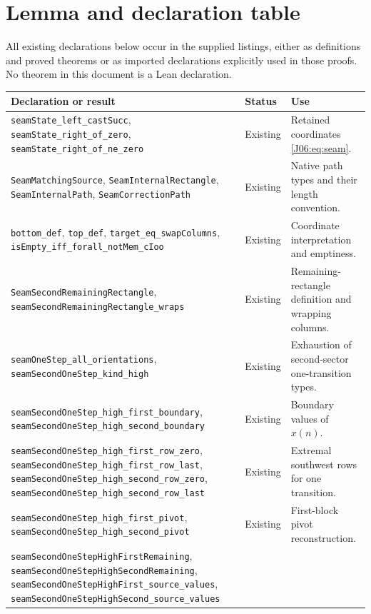 \documentclass[11pt,oneside]{report}
\theoremstyle{definition}
\numberwithin{equation}{section}
\newcommand{\decl}[1]{\textnormal{\nolinkurl{#1}}}
\begin{document}
\section{Lemma and declaration table}

All existing declarations below occur in the supplied listings, either
as definitions and proved theorems or as imported declarations explicitly
used in those proofs. No theorem in this document is a Lean declaration.

\small
\begin{longtable}{@{}>{\raggedright\arraybackslash}p{}>{\raggedright\arraybackslash}p{}>{\raggedright\arraybackslash}p{}@{}}
\toprule
Declaration or result & Status & Use\\
\midrule
\endhead
\decl{seamState_left_castSucc},
\decl{seamState_right_of_zero},
\decl{seamState_right_of_ne_zero}
& Existing & Retained coordinates \eqref{J06:eq:seam}.\\
\decl{SeamMatchingSource},
\decl{SeamInternalRectangle},
\decl{SeamInternalPath},
\decl{SeamCorrectionPath}
& Existing & Native path types and their length convention.\\
\decl{bottom_def}, \decl{top_def},
\decl{target_eq_swapColumns},
\decl{isEmpty_iff_forall_notMem_cIoo}
& Existing & Coordinate interpretation and emptiness.\\
\decl{SeamSecondRemainingRectangle},
\decl{seamSecondRemainingRectangle_wraps}
& Existing & Remaining-rectangle definition and wrapping columns.\\
\decl{seamOneStep_all_orientations},
\decl{seamSecondOneStep_kind_high}
& Existing & Exhaustion of second-sector one-transition types.\\
\decl{seamSecondOneStep_high_first_boundary},
\decl{seamSecondOneStep_high_second_boundary}
& Existing & Boundary values of $x(n)$.\\
\decl{seamSecondOneStep_high_first_row_zero},
\decl{seamSecondOneStep_high_first_row_last},
\decl{seamSecondOneStep_high_second_row_zero},
\decl{seamSecondOneStep_high_second_row_last}
& Existing & Extremal southwest rows for one transition.\\
\decl{seamSecondOneStep_high_first_pivot},
\decl{seamSecondOneStep_high_second_pivot}
& Existing & First-block pivot reconstruction.\\
\decl{seamSecondOneStepHighFirstRemaining},
\decl{seamSecondOneStepHighSecondRemaining},
\decl{seamSecondOneStepHighFirst_source_values},
\decl{seamSecondOneStepHighSecond_source_values}

\end{longtable}
\end{document}
